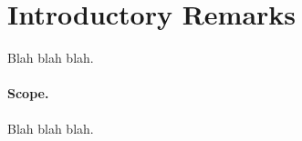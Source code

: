 \section{Introductory Remarks}

Blah blah blah.

 

\paragraph{Scope.} 
Blah blah blah.


%
%
%
%
%

